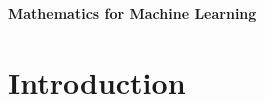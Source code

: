 \documentclass[11pt,a4paper]{report}
\begin{document}
	\clearpage
	\thispagestyle{empty}
		\begin{center}\LARGE\bf
			Mathematics for Machine Learning
		\end{center}
	\newpage
	\setcounter{page}{1}
\chapter{Introduction}
\end{document}

